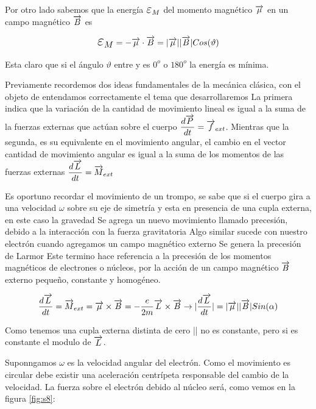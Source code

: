 Por otro lado sabemos que la energía $\Bb{\varepsilon}_{M}$ del momento magnético $\overrightarrow{\mu}$ en un campo magnético $\overrightarrow{B}$ es 

\begin{equation*}
	\Bb{\varepsilon}_{M}=-\V{\mu}\cdot \V{B}= |\V{\mu}||\V{B}|Cos(\vartheta)
\end{equation*}

Esta claro que si el ángulo $\vartheta$ entre \V{\mu} y  es $0^{o}$ o $180^{o}$ la
energía es mínima.

Previamente recordemos dos ideas fundamentales de la mecánica clásica, con el objeto de entendamos correctamente el tema que desarrollaremos La primera indica que la variación de la cantidad de movimiento lineal es igual a la suma de la fuerzas externas que actúan sobre el cuerpo $\dfrac{d\overrightarrow{P}}{dt}=\overrightarrow{f}_{ext}$. Mientras que la segunda, es su equivalente en el movimiento angular, el cambio en el vector cantidad de movimiento angular es igual a la suma de los momentos de las fuerzas externas  $\dfrac{d\overrightarrow{L}}{dt}=\overrightarrow{M}_{ext}$

Es oportuno recordar el movimiento de un trompo, se sabe que si el cuerpo gira a una velocidad $\omega$ sobre su eje de simetría y esta en presencia de una cupla externa, en este caso la gravedad Se agrega un nuevo movimiento llamado precesión, debido a la interacción con la fuerza gravitatoria Algo similar sucede con nuestro electrón cuando agregamos un campo magnético externo Se genera la precesión de Larmor Este termino hace referencia a la precesión de los momentos magnéticos de electrones o núcleos, por la acción de un campo magnético $\overrightarrow{B}$ externo pequeño, constante y homogéneo.

\begin{equation*}
	\dfrac{d\overrightarrow{L}}{dt}=\overrightarrow{M}_{ext} = \overrightarrow{\mu} \times \overrightarrow{B} = -\dfrac{e}{2m}\overrightarrow{L}\times\overrightarrow{B}\rightarrow |\dfrac{d\overrightarrow{L}}{dt}|= |\overrightarrow{\mu}||\overrightarrow{B}| Sin(\alpha)
\end{equation*}

Como tenemos una cupla externa distinta de cero || no es constante, pero si es constante el modulo de $\overrightarrow{L}$.

Suponngamos $\omega$ es la velocidad angular del electrón. Como el movimiento es circular debe existir una aceleración centrípeta responsable del cambio de la velocidad. La fuerza sobre el electrón debido al núcleo será, como vemos en la figura \ref{fig:s8}:

